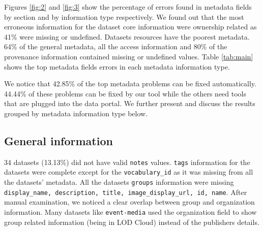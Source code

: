 \documentclass[runningheads,a4paper]{llncs}
\begin{document}
Figures \ref{fig:2} and \ref{fig:3} show the percentage of errors found in metadata fields by section and by information type respectively. We found out that the most erroneous information for the dataset core information were ownership related as 41\% were missing or undefined. Datasets resources have the poorest metadata. 64\% of the general metadata, all the access information and 80\% of the provenance information contained missing or undefined values. Table \ref{tab:main} shows the top metadata fields errors in each metadata information type.

We notice that 42.85\% of the top metadata problems can be fixed automatically. 44.44\% of these problems can be fixed by our tool while the others need tools that are plugged into the data portal. We further present and discuss the results grouped by metadata information type below.

\subsection{General information} 34 datasets (13.13\%) did not have valid \texttt{notes} values. \texttt{tags} information for the datasets were complete except for the \texttt{vocabulary\_id} as it was missing from all the datasets' metadata. All the datasets \texttt{groups} information were missing \texttt{display\_name, description, title, image\_display\_url, id, name}. After \\manual examination, we noticed a clear overlap between group and organization information. Many datasets like \texttt{event-media} used the organization field to show group related information (being in LOD Cloud) instead of the publishers details.\\
\end{document}

